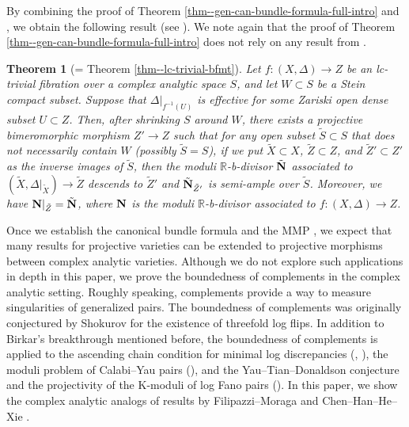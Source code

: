 \documentclass[12pt]{amsart}
\newtheorem{thm}{Theorem}[section]
\theoremstyle{definition}
\begin{document}
By combining the proof of Theorem \ref{thm--gen-can-bundle-formula-full-intro} and \cite[Theorem 7.3]{bfmt}, we obtain the following result (see \cite[7.2.3]{bfmt}). 
We note again that the proof of Theorem \ref{thm--gen-can-bundle-formula-full-intro} does not rely on any result from \cite{bfmt}. 


\begin{thm}[= Theorem \ref{thm--lc-trivial-bfmt}]\label{thm--lc-trivial-bfmt-intro}
Let $f \colon (X,\Delta) \to Z$ be an lc-trivial fibration over a complex analytic space $S$, and let $W \subset S$ be a Stein compact subset. 
Suppose that $\Delta|_{f^{-1}(U)}$ is effective for some Zariski open dense subset $U \subset Z$.
Then, after shrinking $S$ around $W$, there exists a projective bimeromorphic morphism $Z' \to Z$ such that for any open subset $\tilde{S} \subset S$ that does not necessarily contain $W$ (possibly $\tilde{S}=S$), if we put $\tilde{X} \subset X$, $\tilde{Z} \subset Z$, and $\tilde{Z}' \subset Z'$ as the inverse images of $\tilde{S}$, then the moduli $\mathbb{R}$-b-divisor $\tilde{\boldsymbol{\rm N}}$ associated to $(\tilde{X},\Delta|_{\tilde{X}}) \to \tilde{Z}$ descends to $\tilde{Z}'$ and $\tilde{\boldsymbol{\rm N}}_{\tilde{Z}'}$ is semi-ample over $\tilde{S}$. 
Moreover, we have $\boldsymbol{\rm N}|_{\tilde{Z}}=\tilde{\boldsymbol{\rm N}}$, where  $\boldsymbol{\rm N}$ is the moduli $\mathbb{R}$-b-divisor associated to $f \colon (X,\Delta) \to Z$. 
\end{thm}

Once we establish the canonical bundle formula and the MMP \cite{eh-analytic-mmp-2}, we expect that many results for projective varieties can be extended to projective morphisms between complex analytic varieties. Although we do not explore such applications in depth in this paper, we prove the boundedness of complements in the complex analytic setting. 
Roughly speaking, complements provide a way to measure singularities of generalized pairs.
The boundedness of complements was originally conjectured by Shokurov \cite{shokurov-flip} for the existence of threefold log flips. 
In addition to Birkar's breakthrough mentioned before, the boundedness of complements is applied to the ascending chain condition for minimal log discrepancies (\cite{hanliushokurov-acc-mld}, \cite{hanliuluo-acc-mld-3fold}), the moduli problem of Calabi--Yau pairs (\cite{abb+23}), and the Yau--Tian--Donaldson conjecture  and the projectivity of the K-moduli of log Fano pairs (\cite{liuxuzhuang-Kstability}). 
In this paper, we show the complex analytic analogs of results by Filipazzi--Moraga \cite{filipazzi-moraga} and Chen--Han--He--Xie \cite{chhx-compl}. 
\end{document}
